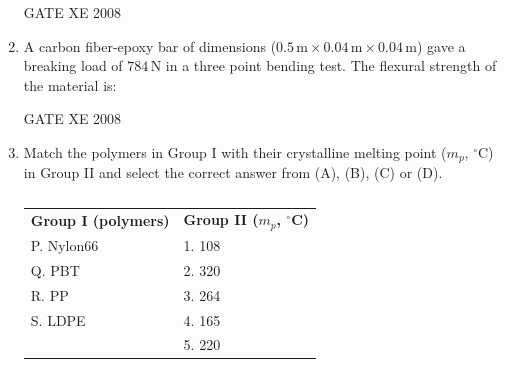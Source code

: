 \documentclass[12pt]{article}
\begin{document}
\begin{enumerate}
\begin{enumerate}
\end{enumerate}

GATE XE 2008

\item A carbon fiber-epoxy bar of dimensions ($0.5\,\mathrm{m} \times 0.04\,\mathrm{m} \times 0.04\,\mathrm{m}$) gave a breaking load of $784\,\mathrm{N}$ in a three point bending test. The flexural strength of the material is:

\begin{enumerate}
\end{enumerate}

GATE XE 2008

\item Match the polymers in Group I with their crystalline melting point ($m_p$, $^\circ$C) in Group II and select the correct answer from (A), (B), (C) or (D).

\begin{table}[H]     \centering     \caption{}     \label{}     \begin{tabular}{l l}
\textbf{Group I (polymers)} & \textbf{Group II ($m_p$, $^\circ$C)} \\
P. Nylon66 & 1. 108 \\
Q. PBT & 2. 320 \\
R. PP & 3. 264 \\
S. LDPE & 4. 165 \\
& 5. 220 \\
\end{tabular} \end{table}

\begin{enumerate}
\end{enumerate}


\end{enumerate}
\end{document}
